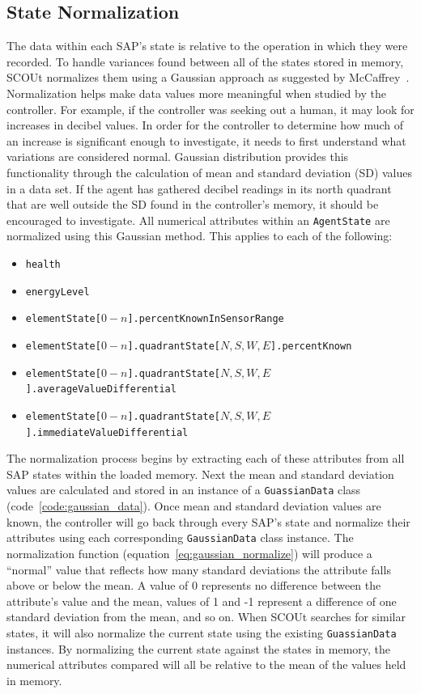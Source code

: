 \subsection{State Normalization}
The data within each SAP's state is relative to the operation in which they were recorded.
To handle variances found between all of the states stored in memory, SCOUt normalizes them using a Gaussian approach as suggested by McCaffrey~\cite{mccaffrey_how_nodate}.
Normalization helps make data values more meaningful when studied by the controller.
For example, if the controller was seeking out a human, it may look for increases in decibel values.
In order for the controller to determine how much of an increase is significant enough to investigate, it needs to first understand what variations are considered normal.
Gaussian distribution provides this functionality through the calculation of mean and standard deviation (SD) values in a data set.
If the agent has gathered decibel readings in its north quadrant that are well outside the SD found in the controller's memory, it should be encouraged to investigate.
All numerical attributes within an \texttt{AgentState} are normalized using this Gaussian method.
This applies to each of the following:


\begin{itemize}
\item \texttt{health}
\item \texttt{energyLevel}
\item \texttt{elementState[$0 - n$].percentKnownInSensorRange}
\item \texttt{elementState[$0 - n$].quadrantState[$N,S,W,E$].percentKnown}
\item \texttt{elementState[$0 - n$].quadrantState[$N,S,W,E$].averageValueDifferential}
\item \texttt{elementState[$0 - n$].quadrantState[$N,S,W,E$].immediateValueDifferential}
\end{itemize}

The normalization process begins by extracting each of these attributes from all SAP states within the loaded memory.
Next the mean and standard deviation values are calculated and stored in an instance of a \texttt{GuassianData} class (code~\ref{code:gaussian_data}).
Once mean and standard deviation values are known, the controller will go back through every SAP's state and normalize their attributes using each corresponding \texttt{GaussianData} class instance.
The normalization function (equation~\ref{eq:gaussian_normalize}) will produce a ``normal'' value that reflects how many standard deviations the attribute falls above or below the mean.
A value of 0 represents no difference between the attribute's value and the mean, values of 1 and -1 represent a difference of one standard deviation from the mean, and so on.
When SCOUt searches for similar states, it will also normalize the current state using the existing \texttt{GuassianData} instances.
By normalizing the current state against the states in memory, the numerical attributes compared will all be relative to the mean of the values held in memory.

